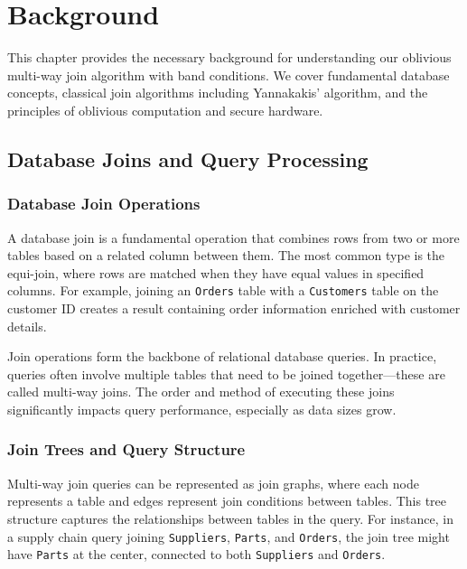 \chapter{Background}

This chapter provides the necessary background for understanding our oblivious multi-way join algorithm with band conditions. We cover fundamental database concepts, classical join algorithms including Yannakakis' algorithm, and the principles of oblivious computation and secure hardware.

\section{Database Joins and Query Processing}

\subsection{Database Join Operations}

A database join is a fundamental operation that combines rows from two or more tables based on a related column between them. The most common type is the equi-join, where rows are matched when they have equal values in specified columns. For example, joining an \texttt{Orders} table with a \texttt{Customers} table on the customer ID creates a result containing order information enriched with customer details.

Join operations form the backbone of relational database queries. In practice, queries often involve multiple tables that need to be joined together---these are called multi-way joins. The order and method of executing these joins significantly impacts query performance, especially as data sizes grow.

\subsection{Join Trees and Query Structure}

Multi-way join queries can be represented as join graphs, where each node represents a table and edges represent join conditions between tables. This tree structure captures the relationships between tables in the query. For instance, in a supply chain query joining \texttt{Suppliers}, \texttt{Parts}, and \texttt{Orders}, the join tree might have \texttt{Parts} at the center, connected to both \texttt{Suppliers} and \texttt{Orders}.

